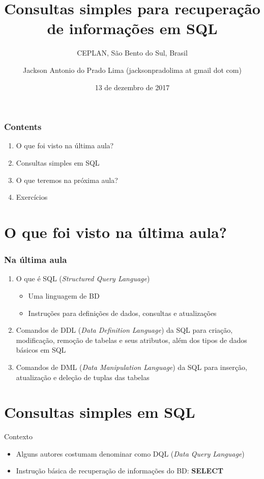 \documentclass[aspectratio=169]{beamer}
\title{Consultas simples para recuperação de informações em SQL}
\author{Jackson Antonio do Prado Lima (jacksonpradolima at gmail dot com)}
\date{13 de dezembro de 2017}
\subtitle{\tiny{CEPLAN, São Bento do Sul, Brasil}}
\begin{document}
	\frame{\titlepage}

	\begin{frame}		
		\frametitle{Contents}
		\begin{enumerate}
			\item O que foi visto na última aula?  \\
			\item Consultas simples em SQL \\
			\item O que teremos na próxima aula? \\
			\item Exercícios  \\
		\end{enumerate}
	\end{frame}

	\startprogressbar
	
	\section{O que foi visto na última aula?}
		\begin{frame}
			\frametitle{Na última aula}
			\begin{enumerate}
				\item O que é SQL (\textit{Structured Query Language})
				\begin{itemize}
					\item Uma linguagem de BD
					\item Instruções para definições de dados, consultas e atualizações
				\end{itemize}
				\item Comandos de DDL (\textit{Data Definition Language}) da SQL para criação, modificação, remoção de tabelas e seus atributos, além dos tipos de dados básicos em SQL
				\item Comandos de DML (\textit{Data Manipulation Language}) da SQL para inserção, atualização e deleção de tuplas das tabelas 
			\end{enumerate}
		\end{frame}

		\section{Consultas simples em SQL}
			\begin{frame}{Contexto}
				\begin{itemize}
					\item Alguns autores costumam denominar como DQL (\textit{Data Query Language})
					\item Instrução básica de recuperação de informações do BD: \textbf{SELECT}
				\end{itemize}
			\end{frame}
		
\end{document}
